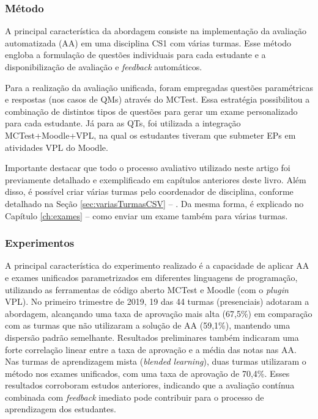 \subsubsection{Método}

A principal característica da abordagem consiste na implementação da avaliação automatizada (AA) em uma disciplina CS1 com várias turmas. Esse método engloba a formulação de questões individuais para cada estudante e a disponibilização de avaliação e \textit{feedback} automáticos.

Para a realização da avaliação unificada, foram empregadas questões paramétricas e respostas (nos casos de QMs) através do MCTest. Essa estratégia possibilitou a combinação de distintos tipos de questões para gerar um exame personalizado para cada estudante. Já para as QTs, foi utilizada a integração MCTest+Moodle+VPL, na qual os estudantes tiveram que submeter EPs em atividades VPL do Moodle.


Importante destacar que todo o processo avaliativo utilizado neste artigo foi previamente detalhado e exemplificado em capítulos anteriores deste livro. Além disso, é possível criar várias turmas pelo coordenador de disciplina, conforme detalhado na Seção \ref{sec:variasTurmasCSV} -- . Da mesma forma, é explicado no Capítulo \ref{ch:exames} --  como enviar um exame também para várias turmas.

\subsubsection{Experimentos}

A principal característica do experimento realizado é a capacidade de aplicar AA e exames unificados parametrizados em diferentes linguagens de programação, utilizando as ferramentas de código aberto MCTest e Moodle (com o \textit{plugin} VPL). No primeiro trimestre de 2019, 19 das 44 turmas (presenciais) adotaram a abordagem, alcançando uma taxa de aprovação mais alta (67,5\%) em comparação com as turmas que não utilizaram a solução de AA (59,1\%), mantendo uma dispersão padrão semelhante. Resultados preliminares também indicaram uma forte correlação linear entre a taxa de aprovação e a média das notas nas AA. Nas turmas de aprendizagem mista (\textit{blended learning}), duas turmas utilizaram o método nos exames unificados, com uma taxa de aprovação de 70,4\%. Esses resultados corroboram estudos anteriores, indicando que a avaliação contínua combinada com \textit{feedback} imediato pode contribuir para o processo de aprendizagem dos estudantes. 

